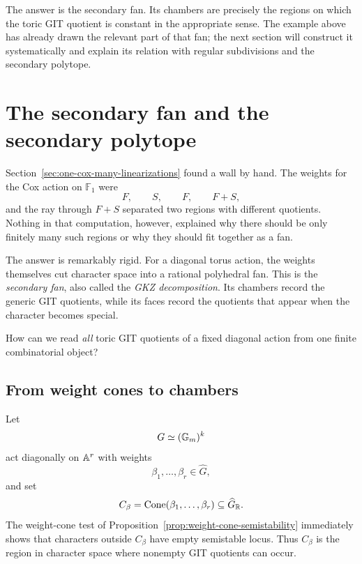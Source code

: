 The answer is the secondary fan.  Its chambers are precisely the
regions on which the toric GIT quotient is constant in the appropriate
sense.  The example above has already drawn the relevant part of that
fan; the next section will construct it systematically and explain its
relation with regular subdivisions and the secondary polytope.

\section{The secondary fan and the secondary polytope}
\label{sec:secondary-fan-polytope}

Section~\ref{sec:one-cox-many-linearizations} found a wall by hand.  The
weights for the Cox action on \(\mathbb F_1\) were
\[
F,\qquad S,\qquad F,\qquad F+S,
\]
and the ray through \(F+S\) separated two regions with different
quotients.  Nothing in that computation, however, explained why there
should be only finitely many such regions or why they should fit
together as a fan.

The answer is remarkably rigid.  For a diagonal torus action, the
weights themselves cut character space into a rational polyhedral fan.
This is the \emph{secondary fan}, also called the \emph{GKZ
decomposition}.  Its chambers record the generic GIT quotients, while
its faces record the quotients that appear when the character becomes
special.

\begin{guidingquestion}
How can we read \emph{all} toric GIT quotients of a fixed diagonal
action from one finite combinatorial object?
\end{guidingquestion}

\subsection{From weight cones to chambers}

Let
\[
G\simeq(\mathbb{G}_{m})^k
\]
act diagonally on \(\mathbb{A}^r\) with weights
\[
\beta_1,\dots,\beta_r\in\widehat G,
\]
and set
\[
C_\beta
=
\operatorname{Cone}(\beta_1,\dots,\beta_r)
\subseteq\widehat G_{\mathbb{R}}.
\]
The weight-cone test of
Proposition~\ref{prop:weight-cone-semistability} immediately shows that
characters outside \(C_\beta\) have empty semistable locus.  Thus
\(C_\beta\) is the region in character space where nonempty GIT
quotients can occur.

